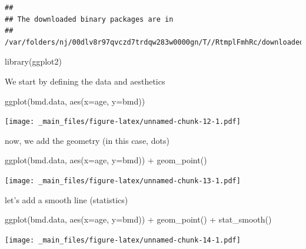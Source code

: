 \documentclass[
]{book}
\newenvironment{Shaded}{\begin{snugshade}}{\end{snugshade}}
\newcommand{\AttributeTok}[1]{\textcolor[rgb]{0.77,0.63,0.00}{#1}}
\newcommand{\FunctionTok}[1]{\textcolor[rgb]{0.00,0.00,0.00}{#1}}
\newcommand{\NormalTok}[1]{#1}
\newcommand{\SpecialCharTok}[1]{\textcolor[rgb]{0.00,0.00,0.00}{#1}}
\begin{document}
\begin{verbatim}
## 
## The downloaded binary packages are in
##  /var/folders/nj/00dlv8r97qvczd7trdqw283w0000gn/T//RtmplFmhRc/downloaded_packages
\end{verbatim}

\begin{Shaded}
\begin{Highlighting}[]
\FunctionTok{library}\NormalTok{(ggplot2)}
\end{Highlighting}
\end{Shaded}

We start by defining the data and aesthetics

\begin{Shaded}
\begin{Highlighting}[]
\FunctionTok{ggplot}\NormalTok{(bmd.data, }\FunctionTok{aes}\NormalTok{(}\AttributeTok{x=}\NormalTok{age, }\AttributeTok{y=}\NormalTok{bmd)) }
\end{Highlighting}
\end{Shaded}

\texttt{[image: \_main\_files/figure-latex/unnamed-chunk-12-1.pdf]}

now, we add the geometry (in this case, dots)

\begin{Shaded}
\begin{Highlighting}[]
\FunctionTok{ggplot}\NormalTok{(bmd.data, }\FunctionTok{aes}\NormalTok{(}\AttributeTok{x=}\NormalTok{age, }\AttributeTok{y=}\NormalTok{bmd)) }\SpecialCharTok{+} 
        \FunctionTok{geom\_point}\NormalTok{()}
\end{Highlighting}
\end{Shaded}

\texttt{[image: \_main\_files/figure-latex/unnamed-chunk-13-1.pdf]}

let's add a smooth line (statistics)

\begin{Shaded}
\begin{Highlighting}[]
\FunctionTok{ggplot}\NormalTok{(bmd.data, }\FunctionTok{aes}\NormalTok{(}\AttributeTok{x=}\NormalTok{age, }\AttributeTok{y=}\NormalTok{bmd)) }\SpecialCharTok{+} 
        \FunctionTok{geom\_point}\NormalTok{() }\SpecialCharTok{+} 
        \FunctionTok{stat\_smooth}\NormalTok{()  }
\end{Highlighting}
\end{Shaded}

\texttt{[image: \_main\_files/figure-latex/unnamed-chunk-14-1.pdf]}
\end{document}
